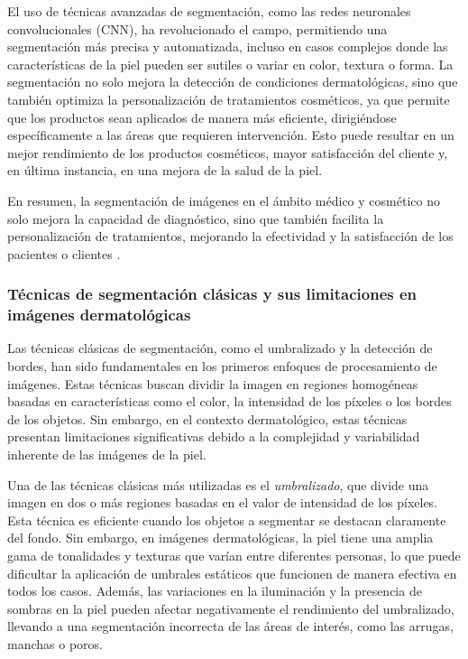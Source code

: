 El uso de técnicas avanzadas de segmentación, como las redes neuronales convolucionales (CNN), ha revolucionado el campo, permitiendo una segmentación más precisa y automatizada, incluso en casos complejos donde las características de la piel pueden ser sutiles o variar en color, textura o forma. La segmentación no solo mejora la detección de condiciones dermatológicas, sino que también optimiza la personalización de tratamientos cosméticos, ya que permite que los productos sean aplicados de manera más eficiente, dirigiéndose específicamente a las áreas que requieren intervención. Esto puede resultar en un mejor rendimiento de los productos cosméticos, mayor satisfacción del cliente y, en última instancia, en una mejora de la salud de la piel.

En resumen, la segmentación de imágenes en el ámbito médico y cosmético no solo mejora la capacidad de diagnóstico, sino que también facilita la personalización de tratamientos, mejorando la efectividad y la satisfacción de los pacientes o clientes \cite{mohammadi2019}.
\subsubsection{Técnicas de segmentación clásicas y sus limitaciones en imágenes dermatológicas}
Las técnicas clásicas de segmentación, como el umbralizado y la detección de bordes, han sido fundamentales en los primeros enfoques de procesamiento de imágenes. Estas técnicas buscan dividir la imagen en regiones homogéneas basadas en características como el color, la intensidad de los píxeles o los bordes de los objetos. Sin embargo, en el contexto dermatológico, estas técnicas presentan limitaciones significativas debido a la complejidad y variabilidad inherente de las imágenes de la piel.

Una de las técnicas clásicas más utilizadas es el \textit{umbralizado}, que divide una imagen en dos o más regiones basadas en el valor de intensidad de los píxeles. Esta técnica es eficiente cuando los objetos a segmentar se destacan claramente del fondo. Sin embargo, en imágenes dermatológicas, la piel tiene una amplia gama de tonalidades y texturas que varían entre diferentes personas, lo que puede dificultar la aplicación de umbrales estáticos que funcionen de manera efectiva en todos los casos. Además, las variaciones en la iluminación y la presencia de sombras en la piel pueden afectar negativamente el rendimiento del umbralizado, llevando a una segmentación incorrecta de las áreas de interés, como las arrugas, manchas o poros.

